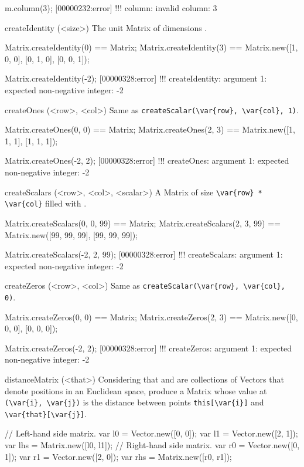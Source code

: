 \begin{urbiscriptapi}
\begin{urbiassert}
m.column(3);
[00000232:error] !!! column: invalid column: 3
\end{urbiassert}


\item[createIdentity](<size>)%
  The unit Matrix of dimensions .
\begin{urbiassert}
Matrix.createIdentity(0) == Matrix;
Matrix.createIdentity(3) == Matrix.new([1, 0, 0], [0, 1, 0], [0, 0, 1]);

Matrix.createIdentity(-2);
[00000328:error] !!! createIdentity: argument 1: expected non-negative integer: -2
\end{urbiassert}


\item[createOnes](<row>, <col>)%
  Same as \lstinline|createScalar(\var{row}, \var{col}, 1)|.
\begin{urbiassert}
Matrix.createOnes(0, 0) == Matrix;
Matrix.createOnes(2, 3) == Matrix.new([1, 1, 1], [1, 1, 1]);

Matrix.createOnes(-2, 2);
[00000328:error] !!! createOnes: argument 1: expected non-negative integer: -2
\end{urbiassert}


\item[createScalars](<row>, <col>, <scalar>)%
  A Matrix of size \lstinline|\var{row} * \var{col}| filled with
  .
\begin{urbiassert}
Matrix.createScalars(0, 0, 99) == Matrix;
Matrix.createScalars(2, 3, 99) == Matrix.new([99, 99, 99], [99, 99, 99]);

Matrix.createScalars(-2, 2, 99);
[00000328:error] !!! createScalars: argument 1: expected non-negative integer: -2
\end{urbiassert}


\item[createZeros](<row>, <col>)%
  Same as \lstinline|createScalar(\var{row}, \var{col}, 0)|.
\begin{urbiassert}
Matrix.createZeros(0, 0) == Matrix;
Matrix.createZeros(2, 3) == Matrix.new([0, 0, 0], [0, 0, 0]);

Matrix.createZeros(-2, 2);
[00000328:error] !!! createZeros: argument 1: expected non-negative integer: -2
\end{urbiassert}


\item[distanceMatrix](<that>)%
  Considering that \this and \that are collections of Vectors that denote
  positions in an Euclidean space, produce a Matrix whose value at
  \lstinline|(\var{i}, \var{j})| is the distance between points
  \lstinline|this[\var{i}]| and \lstinline|\var{that}[\var{j}]|.
\begin{urbiassert}
// Left-hand side matrix.
var l0 = Vector.new([0, 0]);  var l1 = Vector.new([2, 1]);
var lhs = Matrix.new([l0, l1]);
// Right-hand side matrix.
var r0 = Vector.new([0, 1]);  var r1 = Vector.new([2, 0]);
var rhs = Matrix.new([r0, r1]);


\end{urbiassert}
\end{urbiscriptapi}
